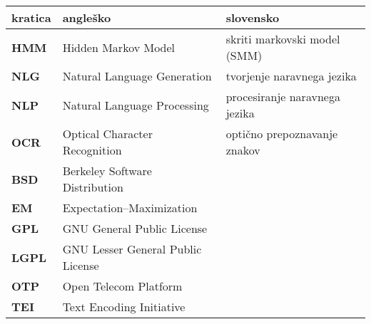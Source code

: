 \begin{tabular}{l|l|l}
  {\bf kratica} & {\bf angleško} & {\bf slovensko} \\
  \hline
  {\bf HMM}  & Hidden Markov Model & skriti markovski model (SMM) \\
  {\bf NLG}  & Natural Language Generation & tvorjenje naravnega jezika \\
  {\bf NLP}  & Natural Language Processing & procesiranje naravnega jezika \\
  {\bf OCR}  & Optical Character Recognition & optično prepoznavanje znakov \\
  \hline
  {\bf BSD}  & Berkeley Software Distribution \\
  {\bf EM}   & Expectation–Maximization \\
  {\bf GPL}  & GNU General Public License \\
  {\bf LGPL} & GNU Lesser General Public License \\
  {\bf OTP}  & Open Telecom Platform \\
  {\bf TEI}  & Text Encoding Initiative \\
\end{tabular}
